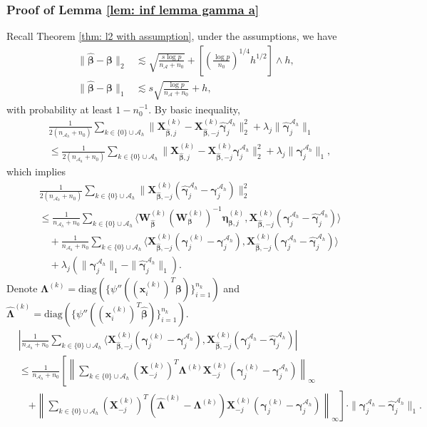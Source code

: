 \documentclass[12pt]{article}
\newcommand{\infnorma}[1]{\left\|#1\right\|_{\infty}}
\newcommand{\twonorm}[1]{\|#1\|_{2}}
\newcommand{\onenorm}[1]{\|#1\|_{1}}
\newcommand{\diag}{\text{diag}}
\newcommand{\norma}[1]{\left|#1\right|}
\newcommand{\bbeta}{\bm{\beta}}
\newcommand{\hbeta}{\hat{\bm{\beta}}}
\newcommand{\bgammaah}{\bm{\gamma}^{\mah}}
\newcommand{\bgammak}[1]{\bm{\gamma}^{(#1)}}
\newcommand{\hgammaah}{\hat{\bm{\gamma}}^{\mah}}
\newcommand{\bxk}[1]{\bm{x}^{(#1)}}
\newcommand{\bXk}[1]{\bm{X}^{(#1)}}
\newcommand{\bmetak}[1]{\bm{\eta}^{(#1)}}
\newcommand{\bWk}[1]{\bm{W}^{(#1)}}
\newcommand{\mah}{\mathcal{A}_h}
\newcommand{\na}{n_{\mathcal{A}}}
\newcommand{\nah}{n_{\mathcal{A}_h}}
\newcommand{\transet}{\{0\}\cup \mah}
\newcommand{\<}{\langle}
\renewcommand{\>}{\rangle}
\begin{document}
\subsubsection{Proof of Lemma \ref{lem: inf lemma gamma a}}
Recall Theorem \ref{thm: l2 with assumption}, under the assumptions, we have
\begin{align}
	\twonorm{\hbeta-\bbeta} &\lesssim \sqrt{\frac{s\log p}{\na+n_0}} + \left[\left(\frac{\log p}{n_0}\right)^{1/4}h^{1/2}\right] \wedge h, \\
	\onenorm{\hbeta-\bbeta} &\lesssim s\sqrt{\frac{\log p}{\na+n_0}} + h,
\end{align}
with probability at least $1-n_0^{-1}$.
By basic inequality,
\begin{align}
	&\frac{1}{2(\nah+n_0)}\sum_{k \in \transet} \twonorm{\bXk{k}_{\hbeta, j}-\bXk{k}_{\hbeta, -j}\hgammaah_j}^2 + \lambda_j\onenorm{\hgammaah_j} \\
	&\leq \frac{1}{2(\nah+n_0)}\sum_{k \in \transet} \twonorm{\bXk{k}_{\hbeta, j}-\bXk{k}_{\hbeta, -j}\bgammaah_j}^2 + \lambda_j\onenorm{\bgammaah_j},
\end{align}
which implies
\begin{align}
	&\frac{1}{2(\nah+n_0)}\sum_{k \in \transet} \twonorm{\bXk{k}_{\hbeta, -j}(\hgammaah_j-\bgammaah_j)}^2 \\
	&\leq \frac{1}{\nah+n_0}\sum_{k \in \transet}\<\bWk{k}_{\hbeta}(\bWk{k}_{\bbeta})^{-1}\bmetak{k}_{\bbeta, j}, \bXk{k}_{\hbeta, -j}(\bgammaah_j - \hgammaah_j)\> \\
	&\quad + \frac{1}{\nah+n_0}\sum_{k \in \transet}\<\bXk{k}_{\hbeta, -j}(\bgammak{k}_j - \bgammaah_j), \bXk{k}_{\hbeta, -j}(\bgammaah_j - \hgammaah_j)\> \\
	&\quad + \lambda_j(\onenorm{\bgammaah_j} - \onenorm{\hgammaah_j}). \label{eq: basic ineq for gamma a}
\end{align}
Denote $\bm{\Lambda}^{(k)} = \diag(\{\psi''((\bxk{k}_i)^T\bbeta)\}_{i=1}^{n_k})$ and $\widehat{\bm{\Lambda}}^{(k)} = \diag(\{\psi''((\bxk{k}_i)^T\hbeta)\}_{i=1}^{n_k})$. 
\begin{align}
	&\norma{\frac{1}{\nah+n_0}\sum_{k \in \transet}\<\bXk{k}_{\hbeta, -j}(\bgammak{k}_j - \bgammaah_j), \bXk{k}_{\hbeta, -j}(\bgammaah_j - \hgammaah_j)} \\
	&\leq \frac{1}{\nah+n_0}\left[\infnorma{\sum_{k \in \transet} (\bXk{k}_{-j})^T\bm{\Lambda}^{(k)}\bXk{k}_{-j}(\bgammak{k}_j - \bgammaah_j)} \right. \\
	&\quad \left. + \infnorma{\sum_{k \in \transet} (\bXk{k}_{-j})^T(\widehat{\bm{\Lambda}}^{(k)} - \bm{\Lambda}^{(k)})\bXk{k}_{-j}(\bgammak{k}_j - \bgammaah_j)}\right]\cdot \onenorm{\bgammaah_j - \hgammaah_j}. \label{eq: gamma a rhs}
\end{align}
\end{document}
